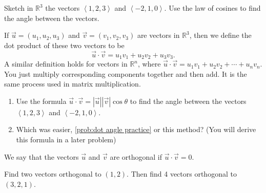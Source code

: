 \begin{problem}\label{prob:dot angle practice}  
%
Sketch in $\mathbb{R}^3$ the vectors $\left<1,2,3\right>$ and $\left<-2,1,0\right>$.  Use the law of cosines to find the angle between the vectors.
\end{problem}

\begin{definition}
If $\vec u = (u_1,u_2,u_3)$ and $\vec v= (v_1,v_2,v_3)$ are vectors in $\mathbb{R}^3$, then we define the dot product of these two vectors to be 
$$\vec u\cdot \vec v = u_1 v_1+ u_2 v_2+ u_3 v_3.$$
A similar definition holds for vectors in $\mathbb{R}^n$, where
$\vec u\cdot \vec v = u_1 v_1+ u_2 v_2+\cdots+ u_n v_n.$
You just multiply corresponding components together and then add. It is the same process used in matrix multiplication.
\end{definition}

\begin{problem}\label{prob:dot angle practice2}
\begin{enumerate}
	\item Use the formula $\vec u\cdot \vec v=|\vec u||\vec v|\cos\theta$ to find the angle between the vectors $\left<1,2,3\right>$ and $\left<-2,1,0\right>$.
	\item Which was easier, \ref{prob:dot angle practice} or this method?  (You will derive this formula in a later problem)
\end{enumerate}
\end{problem}

\begin{definition}\label{def:orthogonal}
We say that the vectors $\vec u$ and $\vec v$ are orthogonal if $\vec u\cdot \vec v=0$. 
\end{definition}

\begin{problem}
Find two vectors orthogonal to $(1,2)$.  Then find 4 vectors orthogonal to $(3,2,1)$.  
\end{problem}

